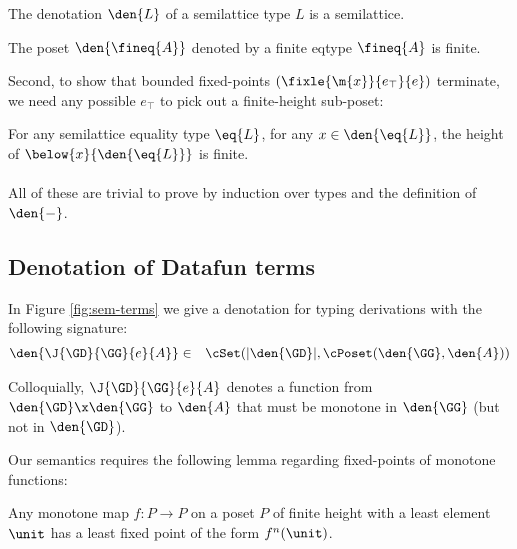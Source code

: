 \begin{lemma}
  The denotation $\den{L}$ of a semilattice type $L$ is a semilattice.
\end{lemma}

\begin{lemma}
  The poset $\den{\fineq{A}}$ denoted by a finite eqtype $\fineq{A}$ is finite.
\end{lemma}

Second, to show that bounded fixed-points $(\fixle{\m{x}}{e_\top}{e})$
terminate, we need any possible $e_\top$ to pick out a finite-height sub-poset:

\begin{lemma}
  For any semilattice equality type $\eq{L}$, for any $x \in \den{\eq{L}}$, the
  height of $\below{x}{\den{\eq{L}}}$ is finite.
\end{lemma}

\paragraph{}
All of these are trivial to prove by induction over types and the definition of
$\den{-}$.


\subsection{Denotation of Datafun terms}

In Figure \ref{fig:sem-terms} we give a denotation for typing derivations with
the following signature:
\begin{eqnarray*}
  \den{\J{\GD}{\GG}{e}{A}} &\in&
  \cSet(\U{\den{\GD}}, \cPoset(\den{\GG}, \den{A}))
\end{eqnarray*}

Colloquially, $\J{\GD}{\GG}{e}{A}$ denotes a function from $\den{\GD} \x
\den{\GG}$ to $\den{A}$ that must be monotone in $\den{\GG}$ (but not in
$\den{\GD}$).

Our semantics requires the following lemma regarding fixed-points of monotone
functions:

\begin{lemma}
  \label{lem:fixed-points-finite-height-posets}
  Any monotone map $f : P \to P$ on a poset $P$ of finite height with a least
  element $\unit$ has a least fixed point of the form $f^n(\unit)$.
\end{lemma}

